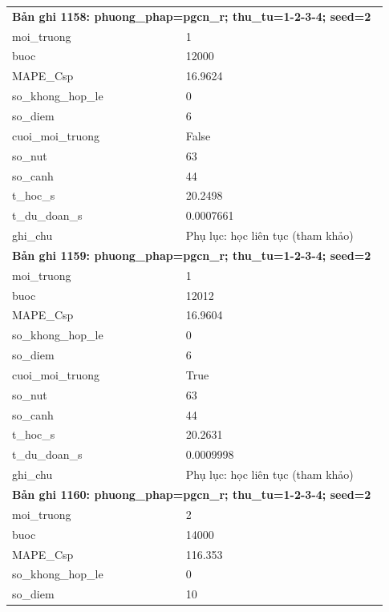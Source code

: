 \begin{longtable}{p{0.43\linewidth}p{0.50\linewidth}}
\midrule
\multicolumn{2}{p{0.95\linewidth}}{\textbf{Bản ghi 1158: phuong\_phap=pgcn\_r; thu\_tu=1-2-3-4; seed=2}} \\
moi\_\allowbreak truong & 1 \\
buoc & 12000 \\
MAPE\_\allowbreak Csp & 16.9624 \\
so\_\allowbreak khong\_\allowbreak hop\_\allowbreak le & 0 \\
so\_\allowbreak diem & 6 \\
cuoi\_\allowbreak moi\_\allowbreak truong & False \\
so\_\allowbreak nut & 63 \\
so\_\allowbreak canh & 44 \\
t\_\allowbreak hoc\_\allowbreak s & 20.2498 \\
t\_\allowbreak du\_\allowbreak doan\_\allowbreak s & 0.0007661 \\
ghi\_\allowbreak chu & Phụ lục: học liên tục (tham khảo) \\
\midrule
\multicolumn{2}{p{0.95\linewidth}}{\textbf{Bản ghi 1159: phuong\_phap=pgcn\_r; thu\_tu=1-2-3-4; seed=2}} \\
moi\_\allowbreak truong & 1 \\
buoc & 12012 \\
MAPE\_\allowbreak Csp & 16.9604 \\
so\_\allowbreak khong\_\allowbreak hop\_\allowbreak le & 0 \\
so\_\allowbreak diem & 6 \\
cuoi\_\allowbreak moi\_\allowbreak truong & True \\
so\_\allowbreak nut & 63 \\
so\_\allowbreak canh & 44 \\
t\_\allowbreak hoc\_\allowbreak s & 20.2631 \\
t\_\allowbreak du\_\allowbreak doan\_\allowbreak s & 0.0009998 \\
ghi\_\allowbreak chu & Phụ lục: học liên tục (tham khảo) \\
\midrule
\multicolumn{2}{p{0.95\linewidth}}{\textbf{Bản ghi 1160: phuong\_phap=pgcn\_r; thu\_tu=1-2-3-4; seed=2}} \\
moi\_\allowbreak truong & 2 \\
buoc & 14000 \\
MAPE\_\allowbreak Csp & 116.353 \\
so\_\allowbreak khong\_\allowbreak hop\_\allowbreak le & 0 \\
so\_\allowbreak diem & 10 \\

\end{longtable}
